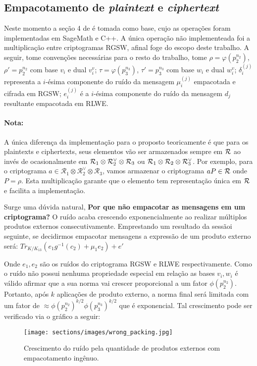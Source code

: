 \subsection{Empacotamento de \textit{plaintext} e \textit{ciphertext}}

Neste momento a seção 4 de \cite{lw23I} é tomada como base, cujo as 
operações foram implementadas em SageMath e C++. A única operação não implementeada foi a multiplicação entre criptogramas RGSW, afinal foge do escopo deste trabalho. A seguir, tome convenções necessárias para o resto do trabalho, tome $\rho = \varphi(p_2^{n_2})$, $\rho' = p_2^{n_2}$ com base $v_i$ e dual $v_i^{v}$; $\tau = \varphi(p_3^{n_3})$, $\tau' = p_3^{n_3}$ com base $w_i$ e dual $w_i^{v}$; $\delta_i^{(j)}$ representa a $i$-ésima componente do ruído da mensagem $\mu_i^{(j)}$ empacotada e cifrada em RGSW; $e_i^{(j)}$ é a $i$-ésima componente do ruído da mensagem $d_j$ resultante empacotada em RLWE.

\paragraph{Nota:} A única diferença da implementação para o proposto teoricamente é que para os plaintexts e ciphertexts, seus elementos vão ser armazenados sempre em $\mathcal{R}$ ao invés de ocasionalmente em $\mathcal{R}_1 \otimes \mathcal{R}_2^\vee \otimes \mathcal{R}_3$ ou $\mathcal{R}_1 \otimes \mathcal{R}_2 \otimes \mathcal{R}_3^\vee$. Por exemplo, para o criptograma  $a \in \mathcal{R}_1 \otimes \mathcal{R}_2^\vee \otimes \mathcal{R}_3$, vamos armazenar o criptograma $aP \in \mathcal{R}$ onde $P = \rho$. Esta multiplicação garante que o elemento tem representação única em $\mathcal{R}$ e facilita a implementação.

Surge uma dúvida natural, \textbf{Por que não empacotar as mensagens em um criptograma?}
O ruído acaba crescendo exponencialmente ao realizar múltiplos produtos externos consecutivamente. Emprestando um resultado da sessãoi seguinte, se decidirmos empacotar mensagens a expressão de um produto externo será: $Tr_{K/K_{13}} (e_1g^{-1}(c_2) + \mu_1 e_2) + e'$

Onde $e_1, e_2$ são os ruídos do criptograma RGSW e RLWE respectivamente. Como o ruído não possui nenhuma propriedade especial em relação as bases $v_i, w_i$ é válido afirmar que a sua norma vai crescer proporcional a um fator $\phi(p_2^{n_2})$. Portanto, após $k$ aplicações de produto externo, a norma final será limitada com um fator de $\approx \phi(p_2^{n_2})^{k/2} \phi(p_3^{n_3})^{k/2}$
que é exponencial. Tal crescimento pode ser verificado via o gráfico a seguir:

\begin{figure}[H]
    \centering
    \texttt{[image: sections/images/wrong\_packing.jpg]}
    \caption{Crescimento do ruído pela quantidade de produtos externos com empacotamento ingênuo.}
    \label{fig:wrong_packing}
\end{figure}
